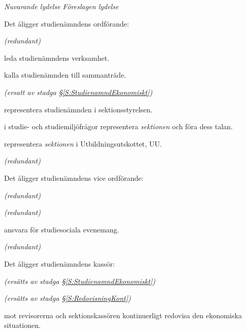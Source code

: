\documentclass{article}
\newenvironment{lydelse}
    {\begin{paracol}{2}%
        \emph{Nuvarande lydelse}%
        \switchcolumn%
        \emph{Föreslagen lydelse}%
    \end{paracol}%
    \begin{enumerate}[label=\thesubsection.\arabic*]%
    \begin{paracol}{2}%
    }{\end{paracol}\end{enumerate}}
\begin{document}
\begin{lydelse}
    \vspace{-0.2em}
    \item Det åligger studienämndens ordförande:
    \begin{aligganden}
        \vspace{-0.2em}
        \item[] \emph{(redundant)}\vspace{0.2em}
        \item leda studienämndens verksamhet.
        \item kalla studienämnden till sammanträde. \vspace{0.5em}
        \item[] \emph{(ersatt av stadga \S \ref{S:StudienamndEkonomiskt})}\vspace{1.4em}
        \item representera studienämnden i sektionsstyrelsen.\vspace{0.2em}
        \item i studie- och studiemiljöfrågor representera \emph{sektionen} och föra dess talan.\vspace{0.2em}
        \item representera \emph{sektionen} i Utbildningsutskottet, UU.
        \item[] \emph{(redundant)} %
    \end{aligganden}
    
    \item[]
    \item[]
    \vspace{3em}
    \item[] \vspace{-0.5em}
    
    \item Det åligger studienämndens vice ordförande:
    \begin{aligganden}
        
        \item[] \emph{(redundant)}
        \item[] \emph{(redundant)}\vspace{1.4em}
        \item ansvara för studiesociala evenemang.
        \item[] \emph{(redundant)}
    \end{aligganden}
    
    \vspace{1.2em}
    \item Det åligger studienämndens kassör:
    \begin{aligganden}
        \item[] \emph{(ersätts av stadga \S \ref{S:StudienamndEkonomiskt})}\vspace{1.2em}
        \item[] \emph{(ersätts av stadga \S \ref{S:RedovisningKont})}\vspace{1.3em}
        \item mot revisorerna och sektionskassören kontinuerligt redovisa den ekonomiska situationen. 
    \end{aligganden}
    

\end{lydelse}
\end{document}
